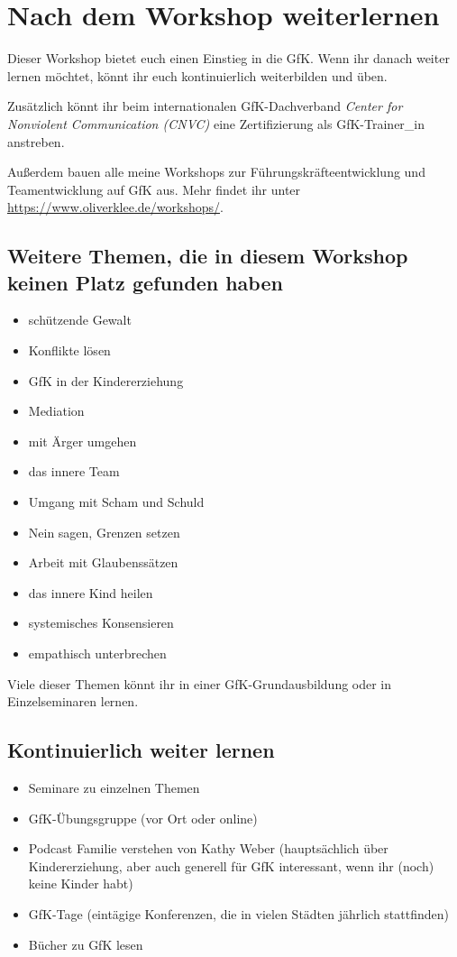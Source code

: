 \section{Nach dem Workshop weiterlernen}
\label{gfk-weiterlernen}

Dieser Workshop bietet euch einen Einstieg in die GfK. Wenn ihr danach weiter lernen möchtet, könnt ihr euch kontinuierlich weiterbilden und üben.

Zusätzlich könnt ihr beim internationalen GfK-Dachverband \emph{Center for Nonviolent Communication (CNVC)} eine Zertifizierung als GfK-Trainer\_in anstreben.

Außerdem bauen alle meine Workshops zur Führungskräfteentwicklung und Teamentwicklung auf GfK aus. Mehr findet ihr unter \url{https://www.oliverklee.de/workshops/}.


\subsection{Weitere Themen, die in diesem Workshop keinen Platz gefunden haben}

\begin{itemize}
  \item schützende Gewalt
  \item Konflikte lösen
  \item GfK in der Kindererziehung
  \item Mediation
  \item mit Ärger umgehen
  \item das innere Team
  \item Umgang mit Scham und Schuld
  \item Nein sagen, Grenzen setzen
  \item Arbeit mit Glaubenssätzen
  \item das innere Kind heilen
  \item systemisches Konsensieren
  \item empathisch unterbrechen
\end{itemize}

Viele dieser Themen könnt ihr in einer GfK-Grundausbildung oder in Einzelseminaren lernen.


\subsection{Kontinuierlich weiter lernen}

\begin{itemize}
  \item Seminare zu einzelnen Themen
  \item GfK-Übungsgruppe (vor Ort oder online)
  \item Podcast \glqq Familie verstehen\grqq\cite{familie-verstehen-podcast} von Kathy Weber (hauptsächlich über Kindererziehung, aber auch generell für GfK interessant, wenn ihr (noch) keine Kinder habt)
  \item GfK-Tage (eintägige Konferenzen, die in vielen Städten jährlich stattfinden)
  \item Bücher zu GfK lesen
\end{itemize}

